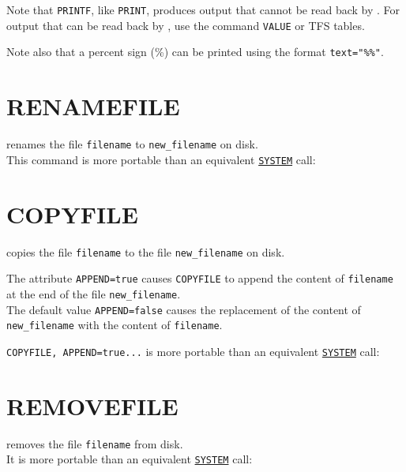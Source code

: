 Note that \texttt{PRINTF}, like \texttt{PRINT}, produces output that
cannot be read back by \madx. For output that can be read back by \madx,
use the command \texttt{VALUE} or TFS tables.

Note also that a percent sign (\%) can be printed using the format
\verb|text="%%"|. 


\section{RENAMEFILE}
\label{sec:renamefile}
renames the file \texttt{filename} to \texttt{new\_filename} on disk. \\
This command is more portable than an equivalent
\hyperref[sec:system]{\texttt{SYSTEM}} call: 

\section{COPYFILE}
\label{sec:copyfile}
copies the file \texttt{filename} to the file \texttt{new\_filename} on disk.

The attribute \texttt{APPEND=true} causes \texttt{COPYFILE} to append
the content of \texttt{filename} at the end of the file
\texttt{new\_filename}.\\ 
The default value \texttt{APPEND=false} causes the replacement of the
content of \texttt{new\_filename} with the content of \texttt{filename}.

\texttt{COPYFILE, APPEND=true...} is more portable than an equivalent
\hyperref[sec:system]{\texttt{SYSTEM}} call: 

\section{REMOVEFILE}
\label{sec:removefile}
removes the file \texttt{filename} from disk. \\
It is more portable than an equivalent \hyperref[sec:system]{\texttt{SYSTEM}} call: 

